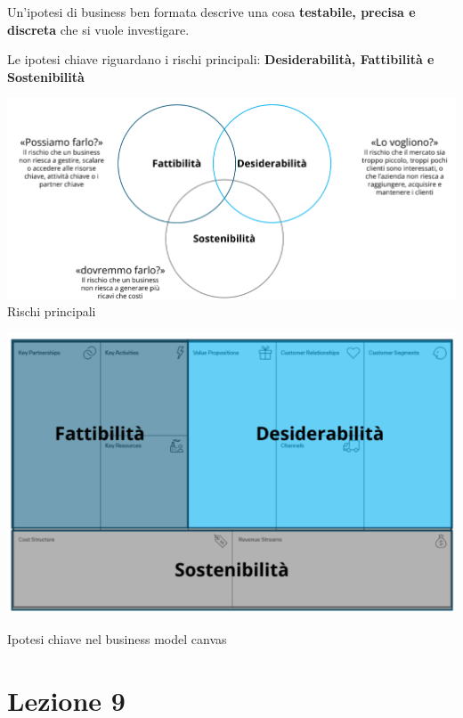 \documentclass[14pt]{extarticle}
\begin{document}
\newpage
Un'ipotesi di business ben formata descrive una cosa \textbf{testabile, precisa
e discreta} che si vuole investigare.

Le ipotesi chiave riguardano i rischi principali: \textbf{Desiderabilità,
Fattibilità e Sostenibilità}

\begin{center}
    \includegraphics[scale=0.55]{images/rischi.png}
    Rischi principali

    \includegraphics[scale=0.80]{images/ipotesi.png}
    
    Ipotesi chiave nel business model canvas
\end{center}

\section{Lezione 9}
\end{document}

